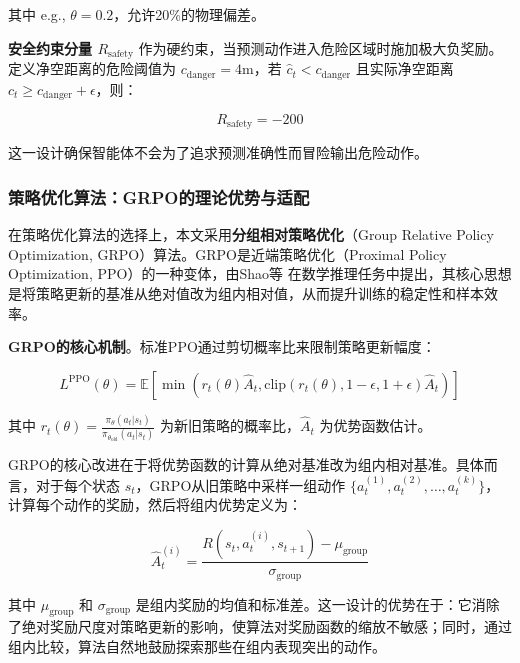 \documentclass[12pt,a4paper]{article}
\begin{document}
其中 e.g., $\theta = 0.2$，允许20\%的物理偏差。

\textbf{安全约束分量 $R_{\text{safety}}$} 作为硬约束，当预测动作进入危险区域时施加极大负奖励。定义净空距离的危险阈值为 $c_{\text{danger}} = 4\text{m}$，若 $\hat{c}_t < c_{\text{danger}}$ 且实际净空距离 $c_t \ge c_{\text{danger}} + \epsilon$，则：

\begin{equation}
R_{\text{safety}} = -200
\end{equation}

这一设计确保智能体不会为了追求预测准确性而冒险输出危险动作。

\subsubsection{策略优化算法：GRPO的理论优势与适配}

在策略优化算法的选择上，本文采用\textbf{分组相对策略优化}（Group Relative Policy Optimization, GRPO）算法。GRPO是近端策略优化（Proximal Policy Optimization, PPO）的一种变体，由Shao等 \cite{shao2024deepseekmath} 在数学推理任务中提出，其核心思想是将策略更新的基准从绝对值改为组内相对值，从而提升训练的稳定性和样本效率。

\textbf{GRPO的核心机制}。标准PPO通过剪切概率比来限制策略更新幅度：

\begin{equation}
L^{\text{PPO}}(\theta) = \mathbb{E}\left[\min\left(r_t(\theta)\hat{A}_t, \text{clip}(r_t(\theta), 1-\epsilon, 1+\epsilon)\hat{A}_t\right)\right]
\end{equation}

其中 $r_t(\theta) = \frac{\pi_\theta(a_t|s_t)}{\pi_{\theta_{\text{old}}}(a_t|s_t)}$ 为新旧策略的概率比，$\hat{A}_t$ 为优势函数估计。

GRPO的核心改进在于将优势函数的计算从绝对基准改为组内相对基准。具体而言，对于每个状态 $s_t$，GRPO从旧策略中采样一组动作 $\{a_t^{(1)}, a_t^{(2)}, \ldots, a_t^{(k)}\}$，计算每个动作的奖励，然后将组内优势定义为：

\begin{equation}
\hat{A}_t^{(i)} = \frac{R(s_t, a_t^{(i)}, s_{t+1}) - \mu_{\text{group}}}{\sigma_{\text{group}}}
\end{equation}

其中 $\mu_{\text{group}}$ 和 $\sigma_{\text{group}}$ 是组内奖励的均值和标准差。这一设计的优势在于：它消除了绝对奖励尺度对策略更新的影响，使算法对奖励函数的缩放不敏感；同时，通过组内比较，算法自然地鼓励探索那些在组内表现突出的动作。
\end{document}
